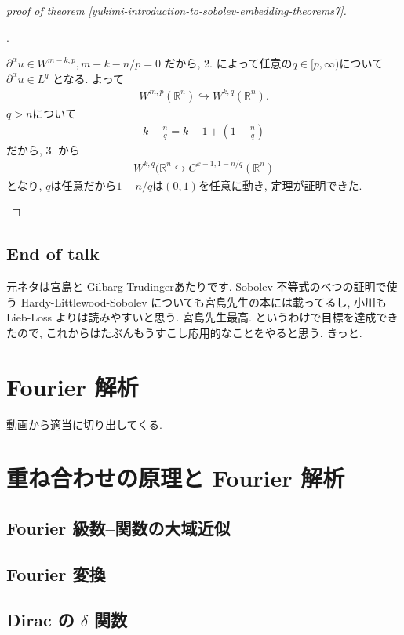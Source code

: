 \documentclass[openany, a4paper, oneside]{book}
\newcounter{enum2}
\renewenvironment{enumerate}{%
\begin{list}%
{%
\arabic{enum2}.\ \,%
}%
{%
\usecounter{enum2}
\setlength{\itemindent}{0pt}%
\setlength{\leftmargin}{6pt}%
\setlength{\rightmargin}{0pt}%
\setlength{\labelsep}{0pt}%
\setlength{\labelwidth}{6pt}%
\setlength{\itemsep}{0pt}%
\setlength{\parsep}{0pt}%
\setlength{\listparindent}{0pt}%
}
}{%
\end{list}%
}
\theoremstyle{break}
\theoremstyle{breakdefn}
\newcommand{\rbk}[1]{\left (#1\right)}
\newcommand{\bbR}{\mathbb{R}}
\begin{document}
\begin{proof}[proof of theorem \ref{yukimi-introduction-to-sobolev-embedding-theorems7}]
\begin{enumerate}
   $\partial^{\alpha}u \in W^{m-k, p}, m-k - n/p =0$ だから, 2. によって任意の$q \in [p, \infty)$について
   $\partial^{\alpha}u \in L^q$ となる.
   よって
   \begin{align}
    W^{m, p}(\bbR^n) \hookrightarrow W^{k, q}(\bbR^n).
   \end{align}
   $q > n$について
   \begin{align}
    k - \frac{n}{q}
    =
    k - 1 + \rbk{1 - \frac{n}{q}}
   \end{align}
   だから, 3. から
   \begin{align}
    W^{k, q}(\bbR^n \hookrightarrow C^{k - 1, 1 - n/q}(\bbR^n)
   \end{align}
   となり, $q$は任意だから$1 - n/q$は$(0, 1)$を任意に動き, 定理が証明できた.
\end{enumerate}
\end{proof}
\section{End of talk}
\label{sec-7-6-4}

元ネタは宮島\cite{ShizuoMiyajima1}と Gilbarg-Trudinger\cite{GilbargTrudinger1}あたりです.
Sobolev 不等式のべつの証明で使う Hardy-Littlewood-Sobolev についても宮島先生の本には載ってるし,
小川\cite{TakayoshiOgawa1}も Lieb-Loss よりは読みやすいと思う.
宮島先生最高.
というわけで目標を達成できたので, これからはたぶんもうすこし応用的なことをやると思う.
きっと.
\chapter{Fourier 解析}
\label{sec-7-7}

動画から適当に切り出してくる.
\chapter{重ね合わせの原理と Fourier 解析}
\label{sec-7-8}
\section{Fourier 級数--関数の大域近似}
\label{sec-7-8-1}
\section{Fourier 変換}
\label{sec-7-8-2}
\section{Dirac の $\delta$ 関数}
\label{sec-7-8-3}
\end{document}
